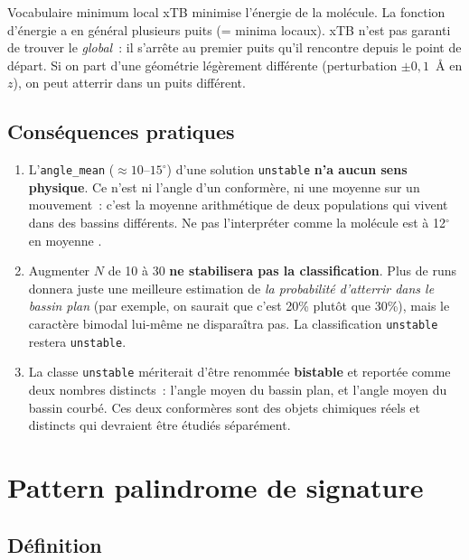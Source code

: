 \documentclass[11pt,a4paper]{article}
\begin{document}
\begin{encadre}{Vocabulaire \og minimum local \fg{}}
xTB minimise l'énergie de la molécule. La fonction d'énergie a en général plusieurs \og puits \fg{} (= minima locaux). xTB n'est pas garanti de trouver le \emph{global}~: il s'arrête au premier puits qu'il rencontre depuis le point de départ. Si on part d'une géométrie légèrement différente (perturbation $\pm 0{,}1$~Å en $z$), on peut atterrir dans un puits différent.
\end{encadre}

\subsection{Conséquences pratiques}

\begin{enumerate}[leftmargin=2em,itemsep=0.3em]
  \item L'\texttt{angle\_mean} ($\approx 10\text{--}15^\circ$) d'une solution \texttt{unstable} \textbf{n'a aucun sens physique}. Ce n'est ni l'angle d'un conformère, ni une moyenne sur un mouvement~: c'est la moyenne arithmétique de deux populations qui vivent dans des bassins différents. Ne pas l'interpréter comme \og la molécule est à 12$^\circ$ en moyenne \fg{}.
  \item Augmenter $N$ de 10 à 30 \textbf{ne stabilisera pas la classification}. Plus de runs donnera juste une meilleure estimation de \emph{la probabilité d'atterrir dans le bassin plan} (par exemple, on saurait que c'est 20\% plutôt que 30\%), mais le caractère bimodal lui-même ne disparaîtra pas. La classification \texttt{unstable} restera \texttt{unstable}.
  \item La classe \texttt{unstable} mériterait d'être renommée \textbf{\og bistable \fg{}} et reportée comme deux nombres distincts~: l'angle moyen du bassin plan, et l'angle moyen du bassin courbé. Ces deux conformères sont des objets chimiques réels et distincts qui devraient être étudiés séparément.
\end{enumerate}

\section{Pattern \og palindrome de signature \fg{}}

\subsection{Définition}
\end{document}
